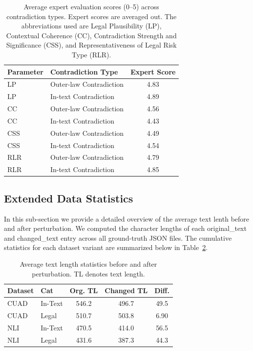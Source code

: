 \documentclass[11pt]{article}
\begin{document}
\begin{table}[h]
\centering
\small
\begin{tabular}{l l c}
\hline
\textbf{Parameter} & \textbf{Contradiction Type} & \textbf{Expert Score} \\
\hline
LP & Outer-law Contradiction & 4.83 \\
LP & In-text Contradiction   & 4.89 \\
CC & Outer-law Contradiction & 4.56 \\
CC & In-text Contradiction   & 4.43 \\
CSS & Outer-law Contradiction & 4.49 \\
CSS & In-text Contradiction   & 4.54 \\
RLR & Outer-law Contradiction & 4.79 \\
RLR & In-text Contradiction   & 4.85 \\
\hline
\end{tabular}
\caption{Average expert evaluation scores (0--5) across contradiction types. Expert scores are averaged out. The abbreviations used are Legal Plausibility (LP), Contextual Coherence (CC), Contradiction Strength and Significance (CSS), and Representativeness of Legal Risk Type (RLR).}
\label{tab:expert_scores_contradiction}
\end{table}

\subsection{Extended Data Statistics}
\label{sec:stats-extend}
In this sub-section we provide a detailed overview of the average text lenth before and after perturbation. We computed the character lengths of each original\_text and changed\_text entry across all ground-truth JSON files. The cumulative statistics for each dataset variant are summarized below in Table~\ref{tab:text_length_stats}.

\begin{table}[h]
\centering
\small
\begin{tabular}{l l c c c}
\hline
\textbf{Dataset} & \textbf{Cat} & \textbf{Org. TL} & \textbf{Changed TL} & \textbf{Diff.} \\
\hline
CUAD & In-Text & 546.2 & 496.7 & 49.5 \\
CUAD & Legal   & 510.7 & 503.8 & 6.90 \\
NLI  & In-Text & 470.5 & 414.0 & 56.5 \\
NLI  & Legal   & 431.6 & 387.3 & 44.3 \\
\hline
\end{tabular}
\caption{Average text length statistics before and after perturbation. TL denotes text length.}
\label{tab:text_length_stats}
\end{table}
\end{document}
